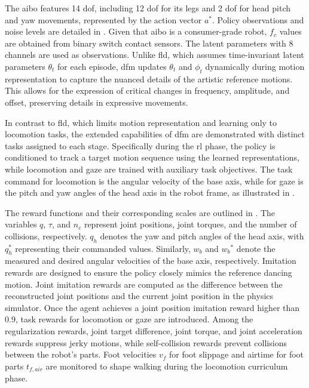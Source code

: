 The aibo features 14 \ac{dof}, including 12 \ac{dof} for its legs and 2 \ac{dof} for head pitch and yaw movements, represented by the action vector ${a}^*$.
Policy observations and noise levels are detailed in .
Given that aibo is a consumer-grade robot, ${f_c}$ values are obtained from binary switch contact sensors.
The latent parameters with 8 channels are used as observations.
Unlike \ac{fld}, which assumes time-invariant latent parameters $\theta_t$ for each episode, \ac{dfm} updates $\theta_t$ and $\phi_t$ dynamically during motion representation to capture the nuanced details of the artistic reference motions.
This allows for the expression of critical changes in frequency, amplitude, and offset, preserving details in expressive movements.

In contrast to \ac{fld}, which limits motion representation and learning only to locomotion tasks, the extended capabilities of \ac{dfm} are demonstrated with distinct tasks assigned to each stage.
Specifically during the \ac{rl} phase, the policy is conditioned to track a target motion sequence using the learned representations, while locomotion and gaze are trained with auxiliary task objectives.
The task command for locomotion is the angular velocity of the base axis, while for gaze is the pitch and yaw angles of the head axis in the robot frame, as illustrated in .

The reward functions and their corresponding scales are outlined in .
The variables ${q}$, ${\tau}$, and ${n}_{c}$ represent joint positions, joint torques, and the number of collisions, respectively.
${q}_{h}$ denotes the yaw and pitch angles of the head axis, with ${q}_{h}^*$ representing their commanded values.
Similarly, ${{w}_{b}}$ and ${{w}_{b}}^*$ denote the measured and desired angular velocities of the base axis, respectively.
Imitation rewards are designed to ensure the policy closely mimics the reference dancing motion.
Joint imitation rewards are computed as the difference between the reconstructed joint positions and the current joint position in the physics simulator.
Once the agent achieves a joint position imitation reward higher than 0.9, task rewards for locomotion or gaze are introduced.
Among the regularization rewards, joint target difference, joint torque, and joint acceleration rewards suppress jerky motions, while self-collision rewards prevent collisions between the robot’s parts.
Foot velocities ${{v}_{f}}$ for foot slippage and airtime for foot parts ${t}_{f,air}$ are monitored to shape walking during the locomotion curriculum phase.

